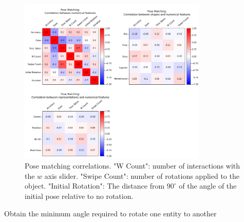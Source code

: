 \documentclass{l4proj}
\begin{document}
\begin{figure}[H]
  \centering
  \includegraphics[width=0.8\textwidth]{images/results/pose_matching_correlations.png}
  \caption{Pose matching correlations. "W Count": number of interactions with the $w$ axis slider. "Swipe Count": number of rotations applied to the object. "Initial Rotation": The distance from $90^{\circ}$ of the angle of the initial pose relative to no rotation.}
  \label{fig:pos_corr}
\end{figure}

\begin{algorithm}[H]
  \DontPrintSemicolon
  
\caption{Obtain the minimum angle required to rotate one entity to another}\label{alg:angle}
\end{algorithm}
\end{document}
